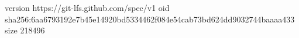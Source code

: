 version https://git-lfs.github.com/spec/v1
oid sha256:6aa6793192e7b45e14920bd5334462f084e54cab73bd624dd9032744baaaa433
size 218496
